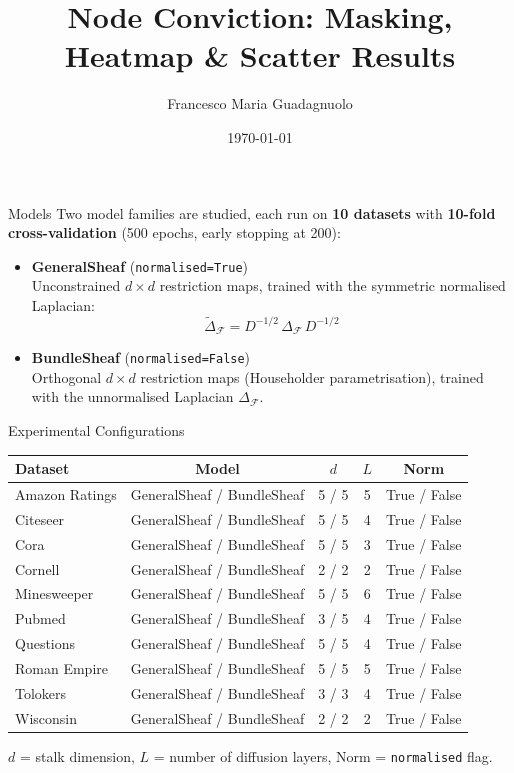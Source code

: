 \documentclass[11pt]{beamer}
\title[Conviction Analysis --- Results]{Node Conviction: Masking, Heatmap \& Scatter Results}
\author{Francesco Maria Guadagnuolo}
\date{\today}
\begin{document}
\frame{\titlepage}





\begin{frame}{Models}
Two model families are studied, each run on \textbf{10 datasets} with \textbf{10-fold cross-validation} (500 epochs, early stopping at 200):
\bigskip
\begin{itemize}
    \setlength\itemsep{1em}
    \item \textbf{GeneralSheaf} (\texttt{normalised=True})\\
    Unconstrained $d\times d$ restriction maps, trained with the symmetric normalised Laplacian:
    \[
        \widetilde{\Delta}_{\mathcal{F}} = D^{-1/2}\,\Delta_{\mathcal{F}}\,D^{-1/2}
    \]

    \item \textbf{BundleSheaf} (\texttt{normalised=False})\\
    Orthogonal $d\times d$ restriction maps (Householder parametrisation), trained with the unnormalised Laplacian $\Delta_{\mathcal{F}}$.
\end{itemize}
\end{frame}


\begin{frame}{Experimental Configurations}
\begin{center}
\renewcommand{\arraystretch}{1.4}
\small
\begin{tabular}{lcccc}
\toprule
\textbf{Dataset} & \textbf{Model} & \textbf{$d$} & \textbf{$L$} & \textbf{Norm} \\
\midrule
Amazon Ratings & GeneralSheaf / BundleSheaf & 5 / 5 & 5 & True / False \\
Citeseer       & GeneralSheaf / BundleSheaf & 5 / 5 & 4 & True / False \\
Cora           & GeneralSheaf / BundleSheaf & 5 / 5 & 3 & True / False \\
Cornell        & GeneralSheaf / BundleSheaf & 2 / 2 & 2 & True / False \\
Minesweeper    & GeneralSheaf / BundleSheaf & 5 / 5 & 6 & True / False \\
Pubmed         & GeneralSheaf / BundleSheaf & 3 / 5 & 4 & True / False \\
Questions      & GeneralSheaf / BundleSheaf & 5 / 5 & 4 & True / False \\
Roman Empire   & GeneralSheaf / BundleSheaf & 5 / 5 & 5 & True / False \\
Tolokers       & GeneralSheaf / BundleSheaf & 3 / 3 & 4 & True / False \\
Wisconsin      & GeneralSheaf / BundleSheaf & 2 / 2 & 2 & True / False \\
\bottomrule
\end{tabular}
\end{center}
\bigskip
\small $d$ = stalk dimension, $L$ = number of diffusion layers, Norm = \texttt{normalised} flag.
\end{frame}
\end{document}
